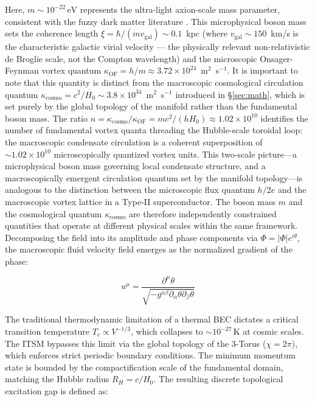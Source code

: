 \documentclass[aps,prd,10pt,twocolumn,superscriptaddress,nofootinbib,floatfix]{revtex4-2}
\begin{document}
Here, $m \sim 10^{-22}\,\text{eV}$ represents the ultra-light axion-scale mass parameter, consistent with the fuzzy dark matter literature \cite{hui_ultralight}. This microphysical boson mass sets the coherence length $\xi = \hbar/(m v_{\text{gal}}) \sim 0.1$~kpc (where $v_{\text{gal}} \sim 150$~km/s is the characteristic galactic virial velocity --- the physically relevant non-relativistic de Broglie scale, not the Compton wavelength) and the microscopic Onsager-Feynman vortex quantum $\kappa_{\text{OF}} = h/m \approx 3.72 \times 10^{24}$~m$^2$~s$^{-1}$. It is important to note that this quantity is distinct from the macroscopic cosmological circulation quantum $\kappa_{\text{cosmo}} = c^2/H_0 \sim 3.8 \times 10^{34}$~m$^2$~s$^{-1}$ introduced in \S\ref{sec:math}, which is set purely by the global topology of the manifold rather than the fundamental boson mass. The ratio $n = \kappa_{\text{cosmo}}/\kappa_{\text{OF}} = mc^2/(hH_0) \approx 1.02 \times 10^{10}$ identifies the number of fundamental vortex quanta threading the Hubble-scale toroidal loop: the macroscopic condensate circulation is a coherent superposition of $\sim 1.02 \times 10^{10}$ microscopically quantized vortex units. This two-scale picture---a microphysical boson mass governing local condensate structure, and a macroscopically emergent circulation quantum set by the manifold topology---is analogous to the distinction between the microscopic flux quantum $h/2e$ and the macroscopic vortex lattice in a Type-II superconductor. The boson mass $m$ and the cosmological quantum $\kappa_{\text{cosmo}}$ are therefore independently constrained quantities that operate at different physical scales within the same framework. Decomposing the field into its amplitude and phase components via $\Phi = |\Phi|e^{i\theta}$, the macroscopic fluid velocity field emerges as the normalized gradient of the phase:

\begin{equation}
u^\mu = \frac{\partial^\mu \theta}{\sqrt{-g^{\alpha\beta}\partial_\alpha \theta \partial_\beta \theta}}
\end{equation}

The traditional thermodynamic limitation of a thermal BEC dictates a critical transition temperature $T_c \propto V^{-1/3}$, which collapses to $\sim 10^{-27}\,\text{K}$ at cosmic scales. The ITSM bypasses this limit via the global topology of the 3-Torus ($\chi = 2\pi$), which enforces strict periodic boundary conditions. The minimum momentum state is bounded by the compactification scale of the fundamental domain, matching the Hubble radius $R_H = c/H_0$. The resulting discrete topological excitation gap is defined as:
\end{document}
